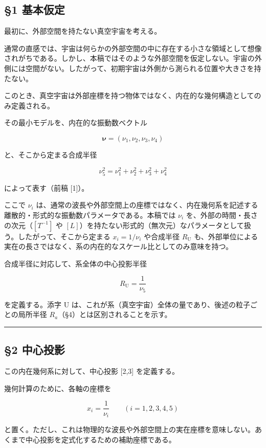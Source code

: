 \documentclass[
]{ltjsarticle}
\begin{document}
\subsection{§1 基本仮定}\label{ux57faux672cux4eeeux5b9a}

最初に、外部空間を持たない真空宇宙を考える。

通常の直感では、宇宙は何らかの外部空間の中に存在する小さな領域として想像されがちである。しかし、本稿ではそのような外部空間を仮定しない。宇宙の外側には空間がない。したがって、初期宇宙は外側から測られる位置や大きさを持たない。

このとき、真空宇宙は外部座標を持つ物体ではなく、内在的な幾何構造としてのみ定義される。

その最小モデルを、内在的な振動数ベクトル

\[\boldsymbol{\nu}=(\nu_1,\nu_2,\nu_3,\nu_4)\]

と、そこから定まる合成半径

\[\nu_5^2=\nu_1^2+\nu_2^2+\nu_3^2+\nu_4^2\]

によって表す（前稿 {[}1{]}）。

ここで \(\nu_i\)
は、通常の波長や外部空間上の座標ではなく、内在幾何系を記述する離散的・形式的な振動数パラメータである。本稿では
\(\nu_i\) を、外部の時間・長さの次元（\([T^{-1}]\) や
\([L]\)）を持たない形式的（無次元）なパラメータとして扱う。したがって、そこから定まる
\(x_i=1/\nu_i\) や合成半径 \(R_{\mathrm U}\)
も、外部単位による実在の長さではなく、系の内在的なスケール比としてのみ意味を持つ。

合成半径に対応して、系全体の中心投影半径

\[R_{\mathrm U}=\frac{1}{\nu_5}\]

を定義する。添字 U
は、これが系（真空宇宙）全体の量であり、後述の粒子ごとの局所半径
\(R_a\)（§4）とは区別されることを示す。

\begin{center}\rule{0.5\linewidth}{0.5pt}\end{center}

\subsection{§2 中心投影}\label{ux4e2dux5fc3ux6295ux5f71}

この内在幾何系に対して、中心投影 {[}2,3{]} を定義する。

幾何計算のために、各軸の座標を

\[x_i=\frac{1}{\nu_i}\qquad(i=1,2,3,4,5)\]

と置く。ただし、これは物理的な波長や外部空間上の実在座標を意味しない。あくまで中心投影を定式化するための補助座標である。
\end{document}
